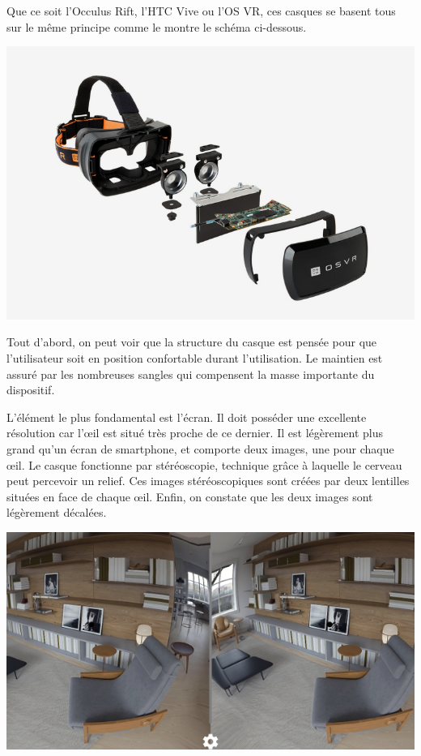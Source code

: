\documentclass[12pt, a4paper]{report}
\begin{document}
Que ce soit l'Occulus Rift, l'HTC Vive ou l'OS VR, ces casques se basent tous sur le même principe comme le montre le schéma ci-dessous.
\begin{center}
\includegraphics[scale=0.3]{eclate.jpg}
\end{center}

Tout d'abord, on peut voir que la structure du casque est pensée pour que l'utilisateur soit en position confortable durant l'utilisation. Le maintien est assuré par les nombreuses sangles qui compensent la masse importante du dispositif.

L'élément le plus fondamental est l'écran. Il doit posséder une excellente résolution car l'\oe{}il est situé très proche de ce dernier. Il est légèrement plus grand qu'un écran de smartphone, et comporte deux images, une pour chaque \oe{}il. Le casque fonctionne par stéréoscopie, technique grâce à laquelle le cerveau peut percevoir un relief. Ces images stéréoscopiques sont créées par deux lentilles situées en face de chaque \oe{}il. Enfin, on constate que les deux images sont légèrement décalées.

\begin{center}
\includegraphics[scale=0.5]{ecran.jpg}
\end{center}
\end{document}
